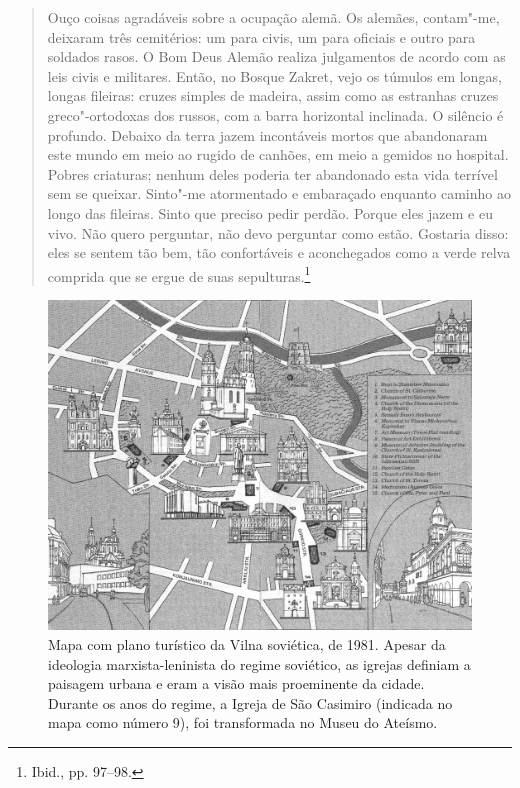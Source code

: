 \begin{quote}
Ouço coisas agradáveis sobre a ocupação alemã. Os alemães, contam"-me,
deixaram três cemitérios: um para civis, um para oficiais e outro para
soldados rasos. O Bom Deus Alemão realiza julgamentos de acordo com as
leis civis e militares. Então, no Bosque Zakret, vejo os túmulos em
longas, longas fileiras: cruzes simples de madeira, assim como as
estranhas cruzes greco"-ortodoxas dos russos, com a barra horizontal
inclinada. O silêncio é profundo. Debaixo da terra jazem incontáveis
mortos que abandonaram este mundo em meio ao rugido de canhões, em meio
a gemidos no hospital. Pobres criaturas; nenhum deles poderia ter
abandonado esta vida terrível sem se queixar. Sinto"-me atormentado e
embaraçado enquanto caminho ao longo das fileiras. Sinto que preciso
pedir perdão. Porque eles jazem e eu vivo. Não quero perguntar, não devo
perguntar como estão. Gostaria disso: eles se sentem tão bem, tão
confortáveis e aconchegados como a verde relva comprida que se ergue de
suas sepulturas.\footnote{Ibid., pp. 97--98.}
\end{quote}

\begin{figure}[!h]
    \centering
    \includegraphics[width=\textwidth]{ilustra-10.png}
    \caption{Mapa com plano turístico da Vilna soviética, de 1981. Apesar da ideologia marxista-leninista do regime soviético, as igrejas definiam a paisagem urbana e eram a visão mais proeminente da cidade. Durante os anos do regime, a Igreja de São Casimiro (indicada no mapa como número 9), foi transformada no Museu do Ateísmo.}
\end{figure}

